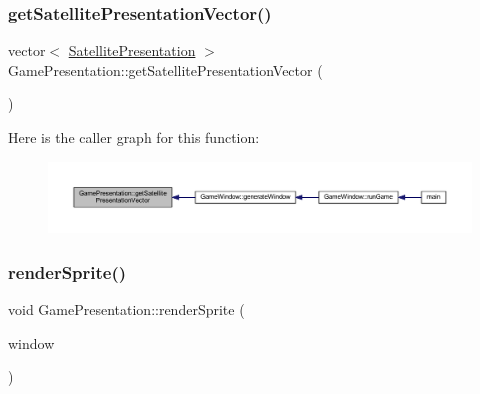 \subsubsection{\texorpdfstring{get\+Satellite\+Presentation\+Vector()}{getSatellitePresentationVector()}}
{\footnotesize\ttfamily vector$<$ \hyperlink{class_satellite_presentation}{Satellite\+Presentation} $>$ Game\+Presentation\+::get\+Satellite\+Presentation\+Vector (\begin{DoxyParamCaption}{ }\end{DoxyParamCaption})}

Here is the caller graph for this function\+:\nopagebreak
\begin{figure}[H]
\begin{center}
\leavevmode
\includegraphics[width=350pt]{class_game_presentation_a8bb8847556bd4977479df73eec79b2eb_icgraph}
\end{center}
\end{figure}
\mbox{\label{class_game_presentation_ae2a317ddda3f666fdb1ca4f4c68f6b49}} 
\subsubsection{\texorpdfstring{render\+Sprite()}{renderSprite()}}
{\footnotesize\ttfamily void Game\+Presentation\+::render\+Sprite (\begin{DoxyParamCaption}\item[{Render\+Window \&}]{window }\end{DoxyParamCaption})}

